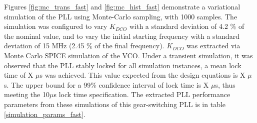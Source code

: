 		\FloatBarrier
		Figures \ref{fig:mc_trans_fast} and \ref{fig:mc_hist_fast} demonstrate a variational simulation of the PLL using Monte-Carlo sampling, with 1000 samples. The simulation was configured to vary $K_{DCO}$ with a standard deviation of 4.2 \% of the nominal value, and to vary the initial starting frequency with a standard deviation of 15 MHz (2.45 \% of the final frequency). $K_{DCO}$ was extracted via Monte Carlo SPICE simulation of the VCO. Under a transient simulation, it was observed that the PLL stably locked for all simulation instances, a mean lock time of X $\mu$s was achieved. This value expected from the design equations is X $\mu$s. The upper bound for a 99\% confidence interval of lock time is X $\mu$s, thus meeting the 10$\mu$s lock time specification. The extracted PLL performance parameters from these simulations of this gear-switching PLL is in table \ref{simulation_params_fast}. 

